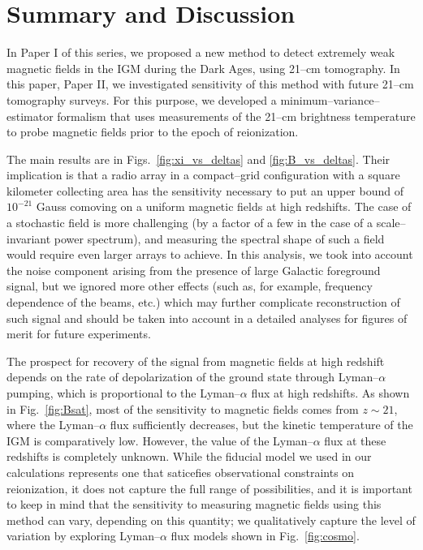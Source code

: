 \section{Summary and Discussion}
\label{sec:conclusions}

In Paper I of this series, we proposed a new method to detect extremely weak magnetic fields in the IGM during the Dark Ages, using 21--cm tomography. In this paper, Paper II, we investigated sensitivity of this method with future 21--cm tomography surveys. For this purpose, we developed a minimum--variance--estimator formalism that uses measurements of the 21--cm brightness temperature to probe magnetic fields prior to the epoch of reionization. 

The main results are in Figs.~\ref{fig:xi_vs_deltas} and \ref{fig:B_vs_deltas}. Their implication is that a radio array in a compact--grid configuration with a square kilometer collecting area has the sensitivity necessary to put an upper bound of $10^{-21}$ Gauss comoving on a uniform magnetic fields at high redshifts. The case of a stochastic field is more challenging (by a factor of a few in the case of a scale--invariant power spectrum), and measuring the spectral shape of such a field would require even larger arrays to achieve. In this analysis, we took into account the noise component arising from the presence of large Galactic foreground signal, but we ignored more other effects (such as, for example, frequency dependence of the beams, etc.) which may further complicate reconstruction of such signal and should be taken into account in a detailed analyses for figures of merit for future experiments.

The prospect for recovery of the signal from magnetic fields at high redshift  depends on the rate of depolarization of the ground state through Lyman--$\alpha$ pumping, which is proportional to the Lyman--$\alpha$ flux at high redshifts. As shown in Fig.~\ref{fig:Bsat}, most of the sensitivity to magnetic fields comes from $z\sim 21$, where the Lyman--$\alpha$ flux sufficiently decreases, but the kinetic temperature of the IGM is comparatively low. However, the value of the Lyman--$\alpha$ flux at these redshifts is completely unknown. While the fiducial model we used in our calculations represents one that saticefies observational constraints on reionization, it does not capture the full range of possibilities, and it is important to keep in mind that the sensitivity to measuring magnetic fields using this method can vary, depending on this quantity; we qualitatively capture the level of variation by exploring Lyman--$\alpha$ flux models shown in Fig.~\ref{fig:cosmo}.

